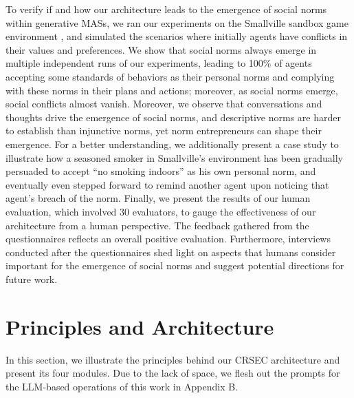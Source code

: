 \documentclass{article}
\begin{document}
To verify if and how our architecture leads to the emergence of social norms within generative MASs,  
we ran our experiments on the Smallville sandbox game environment \cite{Park2023GenerativeAgents}, and simulated the scenarios where initially agents have conflicts in their values and preferences.
We show that social norms always emerge in multiple independent runs of our experiments, leading to 100\% of agents accepting some standards of behaviors as their personal norms and complying with these norms in their plans and actions; moreover, as social norms emerge, social conflicts almost vanish.
Moreover, we observe that conversations and thoughts drive the emergence of social
norms, and descriptive norms are harder to establish than injunctive norms, yet norm entrepreneurs can shape their emergence.
For a better understanding, we additionally present a case study to illustrate how a seasoned smoker in Smallville's environment has been gradually persuaded to accept ``no smoking indoors'' as his own personal norm, and eventually even stepped forward to remind another agent upon noticing that agent's breach of the norm. 
Finally, we present the results of our human evaluation, which involved 30 evaluators, to gauge the effectiveness of our architecture from a human perspective. The feedback gathered from the questionnaires reflects an overall positive evaluation. Furthermore, interviews conducted after the questionnaires shed light on aspects that humans consider important for the emergence of social norms and suggest potential directions for future work.


\section{Principles and  Architecture}
\label{sec:method}

In this section, we illustrate the principles behind our CRSEC architecture and present its four modules.  Due to the lack of space, we flesh out the prompts for the LLM-based operations of this work in Appendix B. 
\end{document}
